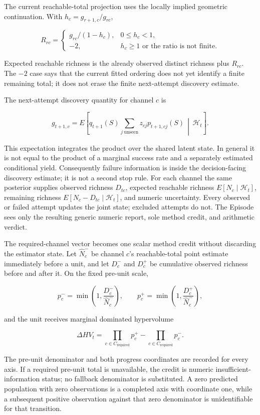 \documentclass[11pt]{article}
\begin{document}
The current reachable-total projection uses the locally implied geometric
continuation.  With $h_c=g_{r+1,c}/g_{rc}$,

\[
R_{rc}=\begin{cases}
g_{rc}/(1-h_c),&0\le h_c<1,\\
-2,&h_c\ge 1\text{ or the ratio is not finite}.
\end{cases}
\]

Expected reachable richness is the already observed distinct richness plus
$R_{rc}$.  The $-2$ case says that the current fitted ordering does not yet
identify a finite remaining total; it does not erase the finite next-attempt
discovery estimate.

The next-attempt discovery quantity for channel $c$ is

\[
g_{t+1,c}=E\!\left[
q_{t+1}(S)\sum_{j\ \mathrm{unseen}}z_{cj}p_{t+1,cj}(S)
\,\middle|\,\mathcal H_t\right].
\]

This expectation integrates the product over the shared latent state.  In
general it is not equal to the product of a marginal success rate and a
separately estimated conditional yield.  Consequently failure information is
inside the decision-facing discovery estimate; it is not a second stop rule.
For each channel the same posterior supplies observed richness $D_{tc}$,
expected reachable richness $E[N_c\mid\mathcal H_t]$, remaining richness
$E[N_c-D_{tc}\mid\mathcal H_t]$, and numeric uncertainty. Every observed or
failed attempt updates the joint state; excluded attempts do not. The Episode
sees only the resulting generic numeric report, sole method credit, and
arithmetic verdict.

The required-channel vector becomes one scalar method credit without
discarding the estimator state. Let
$\widehat N^-_c$ be channel $c$'s reachable-total point estimate immediately
before a unit, and let $D^-_c$ and $D^+_c$ be cumulative observed richness
before and after it.  On the fixed pre-unit scale,

\[
p^-_c=\min\!\left(1,\frac{D^-_c}{\widehat N^-_c}\right),\qquad
p^+_c=\min\!\left(1,\frac{D^+_c}{\widehat N^-_c}\right),
\]

and the unit receives marginal dominated hypervolume

\[
\Delta HV_t=\prod_{c\in C_{\mathrm{required}}}p^+_c
            -\prod_{c\in C_{\mathrm{required}}}p^-_c.
\]

The pre-unit denominator and both progress coordinates are recorded for every
axis. If a required pre-unit total is unavailable, the credit is numeric
insufficient-information status; no fallback denominator is substituted. A
zero predicted population with zero observations is a completed axis with
coordinate one, while a subsequent positive observation against that zero
denominator is unidentifiable for that transition.
\end{document}
